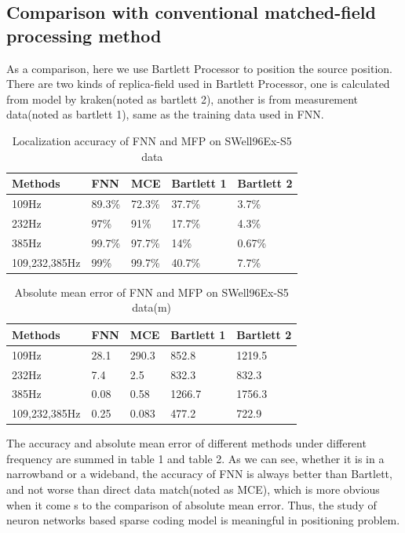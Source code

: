 \subsection{Comparison with conventional matched-field processing method}
As a comparison, here we use Bartlett Processor to position the source position. There are two kinds of replica-field used in Bartlett Processor, one is calculated from model by kraken(noted as bartlett 2), another is from measurement data(noted as bartlett 1), same as the training data used in FNN.
\begin{table}[]
\caption{Localization accuracy of FNN and MFP on SWell96Ex-S5 data}
\label{my-label}
\begin{tabular}{@{}lllll@{}}
\toprule
Methods       & FNN    & MCE    & Bartlett 1 & Bartlett 2 \\ \midrule
109Hz         & 89.3\% & 72.3\% & 37.7\%     & 3.7\%      \\
232Hz         & 97\%   & 91\%   & 17.7\%     & 4.3\%      \\
385Hz         & 99.7\% & 97.7\% & 14\%       & 0.67\%     \\
109,232,385Hz & 99\%   & 99.7\% & 40.7\%     & 7.7\%      \\ \bottomrule
\end{tabular}
\end{table}

\begin{table}[]
\caption{Absolute mean error of FNN and MFP on SWell96Ex-S5 data(m)}
\label{my-label}
\begin{tabular}{@{}lllll@{}}
\toprule
Methods       & FNN  & MCE   & Bartlett 1 & Bartlett 2 \\ \midrule
109Hz         & 28.1 & 290.3 & 852.8      & 1219.5     \\
232Hz         & 7.4  & 2.5   & 832.3      & 832.3      \\
385Hz         & 0.08 & 0.58  & 1266.7     & 1756.3     \\
109,232,385Hz & 0.25 & 0.083 & 477.2      & 722.9      \\ \bottomrule
\end{tabular}
\end{table}

The accuracy and absolute mean error of different methods under different frequency are summed in table 1 and table 2. As we can see, whether it is in a narrowband or a wideband, the accuracy of FNN is always better than Bartlett, and not worse than direct data match(noted as MCE), which is more obvious when it come s to the comparison of absolute mean error. Thus, the study of neuron networks based sparse coding model is meaningful in positioning problem.

